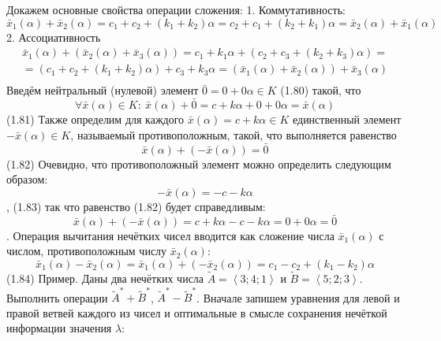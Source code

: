Докажем основные свойства операции сложения:
1. Коммутативность:
\[{{\bar{x}}_{1}}\left( \alpha  \right)+{{\bar{x}}_{2}}\left( \alpha  \right)={{c}_{1}}+{{c}_{2}}+({{k}_{1}}+{{k}_{2}})\alpha ={{c}_{2}}+{{c}_{1}}+({{k}_{2}}+{{k}_{1}})\alpha ={{\bar{x}}_{2}}\left( \alpha  \right)+{{\bar{x}}_{1}}\left( \alpha  \right)\] 
2. Ассоциативность
\[\begin{matrix}
  {{{\bar{x}}}_{1}}\left( \alpha  \right)+\left( {{{\bar{x}}}_{2}}\left( \alpha  \right)+{{{\bar{x}}}_{3}}\left( \alpha  \right) \right)={{c}_{1}}+{{k}_{1}}\alpha +({{c}_{2}}+{{c}_{3}}+({{k}_{2}}+{{k}_{3}})\alpha )= \\ 
  =({{c}_{1}}+{{c}_{2}}+({{k}_{1}}+{{k}_{2}})\alpha )+{{c}_{3}}+{{k}_{3}}\alpha =\left( {{{\bar{x}}}_{1}}\left( \alpha  \right)+{{{\bar{x}}}_{2}}\left( \alpha  \right) \right)+{{{\bar{x}}}_{3}}\left( \alpha  \right) \\ 
\end{matrix}\]
Введём нейтральный (нулевой) элемент
	$\bar{0}=0+0\alpha \in K$ 	(1.80)
такой, что 
	\[\forall \bar{x}(\alpha )\in K:\ \bar{x}(\alpha )+\bar{0}=c+k\alpha +0+0\alpha =\bar{x}(\alpha )\] 	(1.81)
Также определим для каждого $\bar{x}\left( \alpha  \right)=c+k\alpha \in K$ единственный элемент $-\bar{x}\left( \alpha  \right)\in K$, называемый противоположным, такой, что выполняется равенство
	\[\bar{x}\left( \alpha  \right)+\left( -\bar{x}\left( \alpha  \right) \right)=\bar{0}\]	(1.82)
Очевидно, что противоположный элемент можно определить следующим образом:
	\[-\bar{x}\left( \alpha  \right)=-c-k\alpha \], 	(1.83)
так что равенство (1.82) будет справедливым:
	\[\bar{x}\left( \alpha  \right)+\left( -\bar{x}\left( \alpha  \right) \right)=c+k\alpha -c-k\alpha =0+0\alpha =\bar{0}\].
Операция вычитания нечётких чисел вводится как сложение числа ${{\bar{x}}_{1}}\left( \alpha  \right)$ с числом, противоположным числу ${{\bar{x}}_{2}}\left( \alpha  \right)$:
	\[{{\bar{x}}_{1}}\left( \alpha  \right)-{{\bar{x}}_{2}}\left( \alpha  \right)={{\bar{x}}_{1}}\left( \alpha  \right)+\left( -{{{\bar{x}}}_{2}}\left( \alpha  \right) \right)={{c}_{1}}-{{c}_{2}}+\left( {{k}_{1}}-{{k}_{2}} \right)\alpha \] 	(1.84)
Пример. Даны два нечётких числа $\tilde{A}=\left\langle 3;4;1 \right\rangle $ и $\tilde{B}=\left\langle 5;2;3 \right\rangle $. Выполнить операции ${{\tilde{A}}^{*}}+{{\tilde{B}}^{*}}$, ${{\tilde{A}}^{*}}-{{\tilde{B}}^{*}}$.
Вначале запишем уравнения для левой и правой ветвей каждого из чисел и оптимальные в смысле сохранения нечёткой информации значения $\lambda $:
